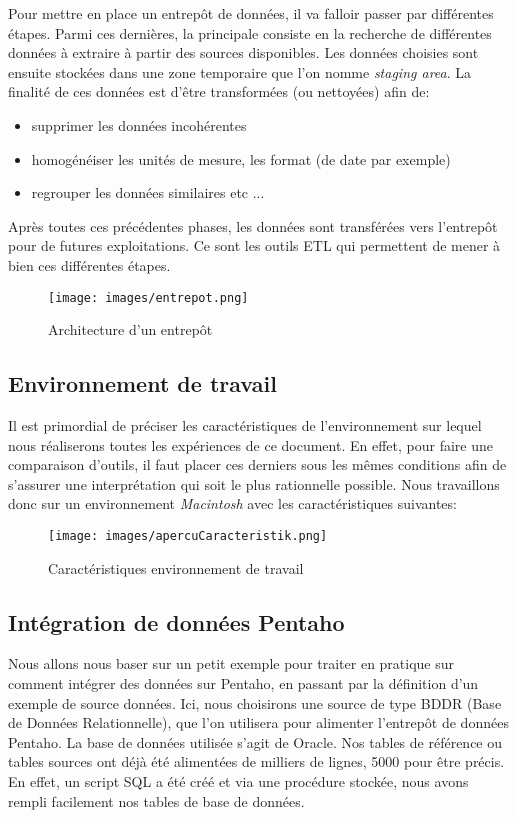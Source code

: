 \documentclass[12pt,a4wide,twoside]{report}
\begin{document}
Pour mettre en place un entrepôt de données, il va falloir passer par différentes étapes. Parmi ces dernières, la principale consiste en la recherche de différentes données à extraire à partir des sources disponibles. Les données choisies sont ensuite stockées dans une zone temporaire que l'on nomme \emph{staging area}. La finalité de ces données est d'être transformées (ou nettoyées) afin de:
\begin{itemize}
	\item supprimer les données incohérentes
	\item homogénéiser les unités de mesure, les format (de date par exemple)
	\item regrouper les données similaires etc ...
\end{itemize}
Après toutes ces précédentes phases, les données sont transférées vers l'entrepôt pour de futures exploitations. \newline 
Ce sont les outils ETL qui permettent de mener à bien ces différentes étapes.

\begin{figure}[!h]
\begin{center}
			\texttt{[image: images/entrepot.png]}
\end{center}
\caption{Architecture d'un entrepôt}
\end{figure}
\subsection{Environnement de travail}
Il est primordial de préciser les caractéristiques de l'environnement sur lequel nous réaliserons toutes les expériences de ce document. En effet, pour faire une comparaison d'outils, il faut placer ces derniers sous les mêmes conditions afin de s'assurer une interprétation qui soit le plus rationnelle possible.\newline
Nous travaillons donc sur un environnement \emph{Macintosh} avec les caractéristiques suivantes:\newline
\begin{figure}[!h]
\begin{center}
			\texttt{[image: images/apercuCaracteristik.png]}
\end{center}
\caption{Caractéristiques environnement de travail}
\end{figure}
\subsection{Intégration de données Pentaho}
Nous allons nous baser sur un petit exemple pour traiter en pratique sur comment intégrer des données sur Pentaho, en passant par la définition d'un exemple de source données. Ici, nous choisirons une source de type BDDR (Base de Données Relationnelle), que l'on utilisera pour alimenter l'entrepôt de données Pentaho. La base de données utilisée s'agit de Oracle. Nos tables de référence ou tables sources ont déjà été alimentées de milliers de lignes, 5000 pour être précis. En effet, un script SQL a été créé et via une procédure stockée, nous avons rempli facilement nos tables de base de données.
\end{document}
